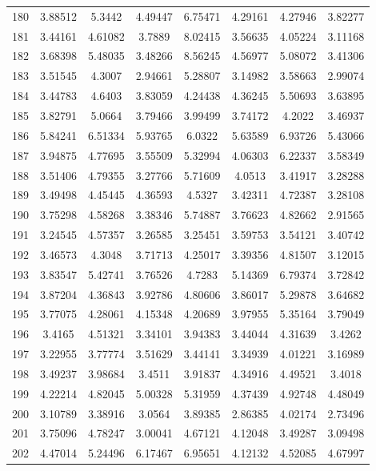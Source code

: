 \begin{center}
\begin{longtable}{cccccccc}
180 & 3.88512 & 5.3442 & 4.49447 & 6.75471 & 4.29161 & 4.27946 & 3.82277\\
181 & 3.44161 & 4.61082 & 3.7889 & 8.02415 & 3.56635 & 4.05224 & 3.11168\\
182 & 3.68398 & 5.48035 & 3.48266 & 8.56245 & 4.56977 & 5.08072 & 3.41306\\
183 & 3.51545 & 4.3007 & 2.94661 & 5.28807 & 3.14982 & 3.58663 & 2.99074\\
184 & 3.44783 & 4.6403 & 3.83059 & 4.24438 & 4.36245 & 5.50693 & 3.63895\\
185 & 3.82791 & 5.0664 & 3.79466 & 3.99499 & 3.74172 & 4.2022 & 3.46937\\
186 & 5.84241 & 6.51334 & 5.93765 & 6.0322 & 5.63589 & 6.93726 & 5.43066\\
187 & 3.94875 & 4.77695 & 3.55509 & 5.32994 & 4.06303 & 6.22337 & 3.58349\\
188 & 3.51406 & 4.79355 & 3.27766 & 5.71609 & 4.0513 & 3.41917 & 3.28288\\
189 & 3.49498 & 4.45445 & 4.36593 & 4.5327 & 3.42311 & 4.72387 & 3.28108\\
190 & 3.75298 & 4.58268 & 3.38346 & 5.74887 & 3.76623 & 4.82662 & 2.91565\\
191 & 3.24545 & 4.57357 & 3.26585 & 3.25451 & 3.59753 & 3.54121 & 3.40742\\
192 & 3.46573 & 4.3048 & 3.71713 & 4.25017 & 3.39356 & 4.81507 & 3.12015\\
193 & 3.83547 & 5.42741 & 3.76526 & 4.7283 & 5.14369 & 6.79374 & 3.72842\\
194 & 3.87204 & 4.36843 & 3.92786 & 4.80606 & 3.86017 & 5.29878 & 3.64682\\
195 & 3.77075 & 4.28061 & 4.15348 & 4.20689 & 3.97955 & 5.35164 & 3.79049\\
196 & 3.4165 & 4.51321 & 3.34101 & 3.94383 & 3.44044 & 4.31639 & 3.4262\\
197 & 3.22955 & 3.77774 & 3.51629 & 3.44141 & 3.34939 & 4.01221 & 3.16989\\
198 & 3.49237 & 3.98684 & 3.4511 & 3.91837 & 4.34916 & 4.49521 & 3.4018\\
199 & 4.22214 & 4.82045 & 5.00328 & 5.31959 & 4.37439 & 4.92748 & 4.48049\\
200 & 3.10789 & 3.38916 & 3.0564 & 3.89385 & 2.86385 & 4.02174 & 2.73496\\
201 & 3.75096 & 4.78247 & 3.00041 & 4.67121 & 4.12048 & 3.49287 & 3.09498\\
202 & 4.47014 & 5.24496 & 6.17467 & 6.95651 & 4.12132 & 4.52085 & 4.67997\\

\end{longtable}
\end{center}
